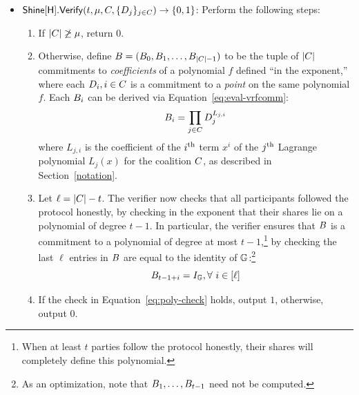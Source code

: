 \begin{itemize}
  \item $\mathsf{Shine}[\mathsf{H}].\mathsf{Verify}(t, \mu, C, \{ D_j \}_{j \in C}) \rightarrow \{ 0, 1\}$:
    Perform the following steps:
    \begin{enumerate}
      \item If $\lvert C \rvert \not\geq \mu$,
        return $0$.
      \item Otherwise, define $B = (B_0, B_1, \ldots, B_{\lvert C\rvert-1})$
        to be the tuple of $\lvert C \rvert$ commitments to \emph{coefficients}
        of a polynomial $f$ defined ``in the exponent,''
        where each $D_i, i \in C$ is a commitment to a \emph{point} on the same polynomial $f$.
      Each $B_i$ can be derived via Equation~\ref{eq:eval-vrfcomm}:
        \begin{equation} \label{eq:eval-vrfcomm}
          B_i = \prod_{j \in C} D_j^{L_{j,i}}
        \end{equation}
        where $L_{j,i}$ is the coefficient of  the $i^{\textrm{\scriptsize th}}$ term $x^i$ of the $j^{\textrm{\scriptsize th}}$ Lagrange polynomial $L_j(x)$ for the coalition $C$,
        as described in Section~\ref{notation}.

      \item Let $\ell = \lvert C \rvert - t$.
        The verifier now checks that all participants followed the protocol honestly,
        by checking in the exponent that their shares lie on a polynomial of degree $t-1$.
        In particular,
        the verifier ensures that $B$ is a commitment to a polynomial of degree at most $t-1$,\footnote{When at least $t$ parties follow the protocol honestly, their shares will completely define this polynomial.}
        by checking the last $\ell$ entries in $B$ are equal to the identity of $\mathbb{G}$:\footnote{As an optimization, note that $B_1, \ldots, B_{t-1}$ need not be computed.}
        \begin{equation} \label{eq:poly-check}
          B_{t-1 + i} = I_{\mathbb{G}}, \forall\ i \in [\ell]
        \end{equation}
      \item If the check in Equation~\ref{eq:poly-check} holds,
        output $1$,
        otherwise, output $0$.

    \end{enumerate}


\end{itemize}
